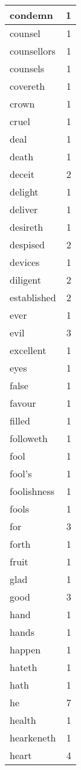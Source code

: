 \begin{center}
\begin{longtable}{l|r}
condemn & 1\\ \hline 
counsel & 1\\ \hline 
counsellors & 1\\ \hline 
counsels & 1\\ \hline 
covereth & 1\\ \hline 
crown & 1\\ \hline 
cruel & 1\\ \hline 
deal & 1\\ \hline 
death & 1\\ \hline 
deceit & 2\\ \hline 
delight & 1\\ \hline 
deliver & 1\\ \hline 
desireth & 1\\ \hline 
despised & 2\\ \hline 
devices & 1\\ \hline 
diligent & 2\\ \hline 
established & 2\\ \hline 
ever & 1\\ \hline 
evil & 3\\ \hline 
excellent & 1\\ \hline 
eyes & 1\\ \hline 
false & 1\\ \hline 
favour & 1\\ \hline 
filled & 1\\ \hline 
followeth & 1\\ \hline 
fool & 1\\ \hline 
fool's & 1\\ \hline 
foolishness & 1\\ \hline 
fools & 1\\ \hline 
for & 3\\ \hline 
forth & 1\\ \hline 
fruit & 1\\ \hline 
glad & 1\\ \hline 
good & 3\\ \hline 
hand & 1\\ \hline 
hands & 1\\ \hline 
happen & 1\\ \hline 
hateth & 1\\ \hline 
hath & 1\\ \hline 
he & 7\\ \hline 
health & 1\\ \hline 
hearkeneth & 1\\ \hline 
heart & 4\\ \hline 

\end{longtable}
\end{center}
